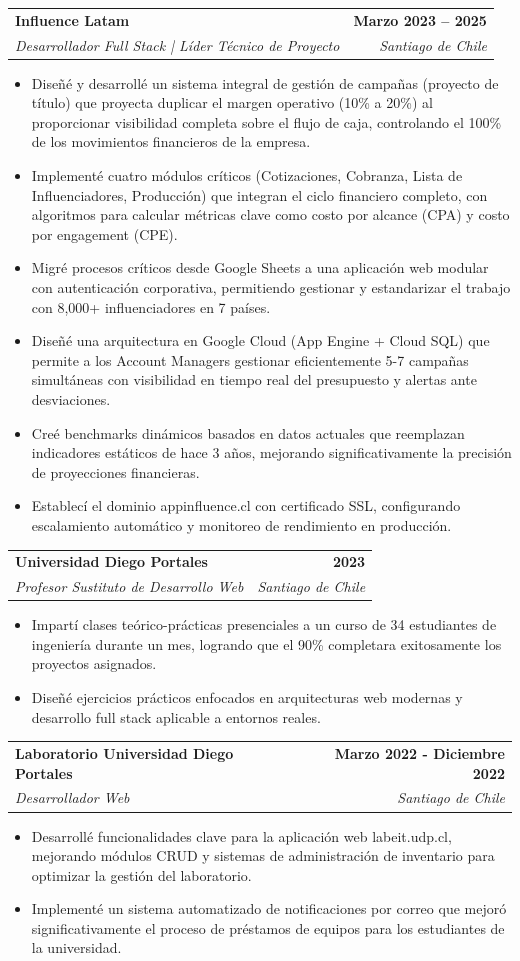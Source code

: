 \documentclass[letterpaper,11pt]{article}
\makeatletter
\newcommand{\resumeItem}[1]{
  \item\small{
    {#1 \vspace{-2pt}}
  }
}
\newcommand{\resumeSubheading}[4]{
  \vspace{-2pt}\item
    \begin{tabular*}{1.0\textwidth}[t]{l@{\extracolsep{\fill}}r}
      \textbf{#1} & \textbf{\small #2} \\
      \textit{\small#3} & \textit{\small #4} \\
    \end{tabular*}\vspace{-7pt}
}
\newcommand{\resumeItemListStart}{\begin{itemize}}
\newcommand{\resumeItemListEnd}{\end{itemize}\vspace{-5pt}}
\makeatother
\begin{document}
\resumeSubheading
{Influence Latam}{Marzo 2023 -- 2025}
{Desarrollador Full Stack | Líder Técnico de Proyecto}{Santiago de Chile}
\resumeItemListStart
\resumeItem{Diseñé y desarrollé un sistema integral de gestión de campañas (proyecto de título) que proyecta duplicar el margen operativo (10\% a 20\%) al proporcionar visibilidad completa sobre el flujo de caja, controlando el 100\% de los movimientos financieros de la empresa.}

\resumeItem{Implementé cuatro módulos críticos (Cotizaciones, Cobranza, Lista de Influenciadores, Producción) que integran el ciclo financiero completo, con algoritmos para calcular métricas clave como costo por alcance (CPA) y costo por engagement (CPE).}
\resumeItem{Migré procesos críticos desde Google Sheets a una aplicación web modular con autenticación corporativa, permitiendo gestionar y estandarizar el trabajo con 8,000+ influenciadores en 7 países.}
\resumeItem{Diseñé una arquitectura en Google Cloud (App Engine + Cloud SQL) que permite a los Account Managers gestionar eficientemente 5-7 campañas simultáneas con visibilidad en tiempo real del presupuesto y alertas ante desviaciones.}
\resumeItem{Creé benchmarks dinámicos basados en datos actuales que reemplazan indicadores estáticos de hace 3 años, mejorando significativamente la precisión de proyecciones financieras.}
\resumeItem{Establecí el dominio appinfluence.cl con certificado SSL, configurando escalamiento automático y monitoreo de rendimiento en producción.}
\resumeItemListEnd

\resumeSubheading
{Universidad Diego Portales}{2023}
{Profesor Sustituto de Desarrollo Web}{Santiago de Chile}
\resumeItemListStart
\resumeItem{Impartí clases teórico-prácticas presenciales a un curso de 34 estudiantes de ingeniería durante un mes, logrando que el 90\% completara exitosamente los proyectos asignados.}
\resumeItem{Diseñé ejercicios prácticos enfocados en arquitecturas web modernas y desarrollo full stack aplicable a entornos reales.}
\resumeItemListEnd

\resumeSubheading
{Laboratorio Universidad Diego Portales}{Marzo 2022 - Diciembre 2022}
{Desarrollador Web}{Santiago de Chile}
\resumeItemListStart
\resumeItem{Desarrollé funcionalidades clave para la aplicación web labeit.udp.cl, mejorando módulos CRUD y sistemas de administración de inventario para optimizar la gestión del laboratorio.}
\resumeItem{Implementé un sistema automatizado de notificaciones por correo que mejoró significativamente el proceso de préstamos de equipos para los estudiantes de la universidad.}
\resumeItemListEnd
\end{document}
